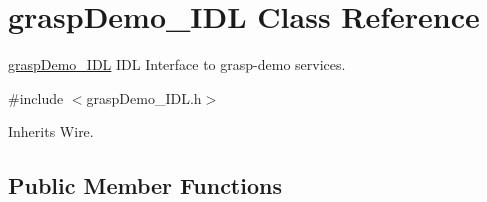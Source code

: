 \section{grasp\+Demo\+\_\+\+I\+DL Class Reference}
\label{classgraspDemo__IDL}


\hyperlink{classgraspDemo__IDL}{grasp\+Demo\+\_\+\+I\+DL} I\+DL Interface to grasp-\/demo services.  




{\ttfamily \#include $<$grasp\+Demo\+\_\+\+I\+D\+L.\+h$>$}



Inherits Wire.

\subsection*{Public Member Functions}

